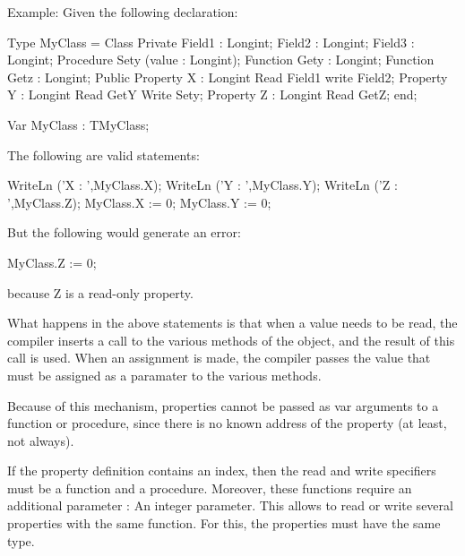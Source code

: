 \documentclass{report}
\begin{document}
Example:
Given the following declaration:
\begin{listing}
Type
  MyClass = Class
    Private
    Field1 : Longint;
    Field2 : Longint;
    Field3 : Longint;
    Procedure  Sety (value : Longint);
    Function Gety : Longint; 
    Function Getz : Longint;
    Public
    Property X : Longint Read Field1 write Field2;
    Property Y : Longint Read GetY Write Sety;
    Property Z : Longint Read GetZ;
    end;

Var MyClass : TMyClass; 
\end{listing}
The following are valid statements:
\begin{listing}
WriteLn ('X : ',MyClass.X);
WriteLn ('Y : ',MyClass.Y);
WriteLn ('Z : ',MyClass.Z);
MyClass.X := 0;
MyClass.Y := 0;
\end{listing}
But the following would generate an error:
\begin{listing}
MyClass.Z := 0;
\end{listing}
because Z is a read-only property.

What happens in the above statements is that when a value needs to be read,
the compiler inserts a call to the various  methods of the
object, and the result of this call is used. When an assignment is made, 
the compiler passes the value that must be assigned as a paramater to 
the various  methods.

Because of this mechanism, properties cannot be passed as var arguments to a
function or procedure, since there is no known address of the property (at
least, not always).

If the property definition contains an index, then the read and write
specifiers must be a function and a procedure. Moreover, these functions
require an additional parameter : An integer parameter. This allows to read
or write several properties with the same function. For this, the properties
must have the same type.
\end{document}
